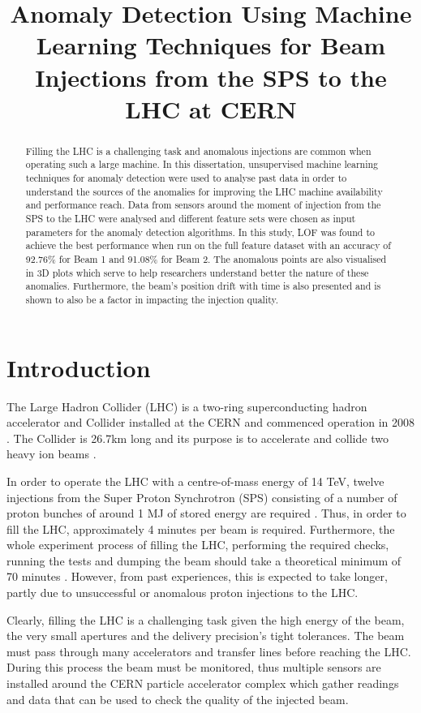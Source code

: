 \documentclass[conference, a4paper]{IEEEtran}
\title{Anomaly Detection Using Machine Learning Techniques for Beam Injections from the SPS to the LHC at CERN}
\author{\IEEEauthorblockN{Marc Ferriggi}
	\IEEEauthorblockA{Department of Computer Science\\
	Faculty of ICT\\
	University of Malta}
	\and
	\IEEEauthorblockN{Dr Ing. Gianluca Valentino}
	\IEEEauthorblockA{(Supervisor)\\
		Faculty of ICT\\
		University of Malta}
}
\begin{document}
	\maketitle
	\begin{abstract}
		Filling the LHC is a challenging task and anomalous injections are common when operating such a large machine. In this dissertation, unsupervised machine learning techniques for anomaly detection were used to analyse past data in order to understand the sources of the anomalies for improving the LHC machine availability and performance reach. Data from sensors around the moment of injection from the SPS to the LHC were analysed and different feature sets were chosen as input parameters for the anomaly detection algorithms. In this study, LOF was found to achieve the best performance when run on the full feature dataset with an accuracy of 92.76\% for Beam 1 and 91.08\% for Beam 2. The anomalous points are also visualised in 3D plots which serve to help researchers understand better the nature of these anomalies. Furthermore, the beam's position drift with time is also presented and is shown to also be a factor in impacting the injection quality.
	\end{abstract}

	\section{Introduction}
	\par The Large Hadron Collider (LHC) is a two-ring superconducting hadron accelerator and Collider installed at the CERN and commenced operation in 2008 \cite{Evans2008}. The Collider is 26.7km long and its purpose is to accelerate and collide two heavy ion beams \cite{Valentino2017}.
	
	\par In order to operate the LHC with a centre-of-mass energy of 14 TeV, twelve injections from the Super Proton Synchrotron (SPS) consisting of a number of proton bunches of around 1 MJ of stored energy are required \cite{Drosdal2011}. Thus, in order to fill the LHC, approximately 4 minutes per beam is required. Furthermore, the whole experiment process of filling the LHC, performing the required checks, running the tests and dumping the beam should take a theoretical minimum of 70 minutes \cite{Evans2008}. However, from past experiences, this is expected to take longer, partly due to unsuccessful or anomalous proton injections to the LHC. 
	
	\par Clearly, filling the LHC is a challenging task given the high energy of the beam, the very small apertures and the delivery precision's tight tolerances. The beam must pass through many accelerators and transfer lines before reaching the LHC. During this process the beam must be monitored, thus multiple sensors are installed around the CERN particle accelerator complex \cite{Lefevre2008} which gather readings and data that can be used to check the quality of the injected beam. 
	
\end{document}
